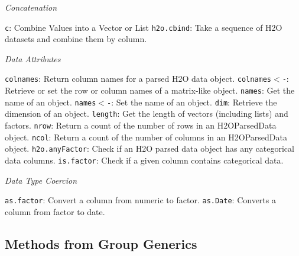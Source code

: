 {\emph{Concatenation}\par
 {\texttt{c}}: Combine Values into a Vector or List\newline%
 {\texttt{h2o.cbind}}: Take a sequence of H2O datasets and combine them by column.\par
{\emph{Data Attributes}}\par
{\texttt{colnames}}: Return column names for a parsed H2O data object. \newline
{\texttt{colnames$<$-}}: Retrieve or set the row or column names of a matrix-like object.\newline
{\texttt{names}}: Get the name of an object. \newline
{\texttt{names$<$-}}: Set the name of an object. \newline
{\texttt{dim}}: Retrieve the dimension of an object. \newline
{\texttt{length}}: Get the length of vectors (including lists) and factors. \newline
{\texttt{nrow}}: Return a count of the number of rows in an H2OParsedData object. \newline
{\texttt{ncol}}: Return a count of the number of columns in an H2OParsedData object.\newline
{\texttt{h2o.anyFactor}}: Check if an H2O parsed data object has any categorical data columns. \newline
{\texttt{is.factor}}: Check if a given column contains categorical data.\newline

{\emph{Data Type Coercion}}\par
{\texttt{as.factor}}: Convert a column from numeric to factor.\newline
{\texttt{as.Date}}: Converts a column from factor to date.\newline

\subsection{Methods from Group Generics}

}
